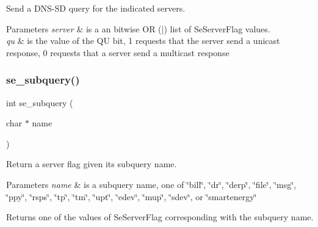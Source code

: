 Send a D\+N\+S-\/\+SD query for the indicated servers. 


\begin{DoxyParams}{Parameters}
{\em server} & is a an bitwise OR ($\vert$) list of Se\+Server\+Flag values. \\
\hline
{\em qu} & is the value of the QU bit, 1 requests that the server send a unicast response, 0 requests that a server send a multicast response \\
\hline
\end{DoxyParams}
\mbox{\label{group__se__discover_ga57f13e11b0b429523f50ae0157aa920d}} 
\subsubsection{\texorpdfstring{se\+\_\+subquery()}{se\_subquery()}}
{\footnotesize\ttfamily int se\+\_\+subquery (\begin{DoxyParamCaption}\item[{char $\ast$}]{name }\end{DoxyParamCaption})}



Return a server flag given its subquery name. 


\begin{DoxyParams}{Parameters}
{\em name} & is a subquery name, one of \char`\"{}bill\char`\"{}, \char`\"{}dr\char`\"{}, \char`\"{}derp\char`\"{}, \char`\"{}file\char`\"{}, \char`\"{}msg\char`\"{}, \char`\"{}ppy\char`\"{}, \char`\"{}rsps\char`\"{}, \char`\"{}tp\char`\"{}, \char`\"{}tm\char`\"{}, \char`\"{}upt\char`\"{}, \char`\"{}edev\char`\"{}, \char`\"{}mup\char`\"{}, \char`\"{}sdev\char`\"{}, or \char`\"{}smartenergy\char`\"{} \\
\hline
\end{DoxyParams}
\begin{DoxyReturn}{Returns}
one of the values of Se\+Server\+Flag corresponding with the subquery name. 
\end{DoxyReturn}
\mbox{\label{group__se__discover_ga2a10a4f15dbb85e5b0b93379f9e48ae8}} 
